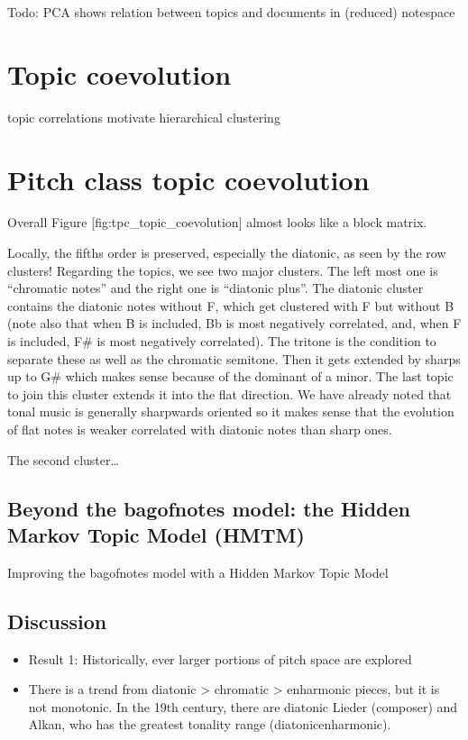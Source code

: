 \documentclass[letterpaper,10pt,english]{sphinxmanual}
\begin{document}
\sphinxAtStartPar
Todo: PCA shows relation between topics and documents in (reduced)
note\sphinxhyphen{}space


\section{Topic coevolution}
\label{\detokenize{5_notes:topic-coevolution}}
\sphinxAtStartPar
topic correlations motivate hierarchical clustering


\section{Pitch class \textendash{} topic coevolution}
\label{\detokenize{5_notes:pitch-class-topic-coevolution}}
\sphinxAtStartPar
Overall Figure {[}fig:tpc\_topic\_coevolution{]} almost looks like a block
matrix.

\sphinxAtStartPar
Locally, the fifths order is preserved, especially the diatonic, as seen
by the row clusters! Regarding the topics, we see two major clusters.
The left most one is “chromatic notes” and the right one is “diatonic
plus”. The diatonic cluster contains the diatonic notes without F, which
get clustered with F but without B (note also that when B is included,
Bb is most negatively correlated, and, when F is included, F\# is most
negatively correlated). The tritone is the condition to separate these
as well as the chromatic semitone. Then it gets extended by sharps up to
G\# which makes sense because of the dominant of a minor. The last topic
to join this cluster extends it into the flat direction. We have already
noted that tonal music is generally sharpwards oriented so it makes
sense that the evolution of flat notes is weaker correlated with
diatonic notes than sharp ones.

\sphinxAtStartPar
The second cluster…


\subsection{Beyond the bag\sphinxhyphen{}of\sphinxhyphen{}notes model: the Hidden Markov Topic Model (HMTM)}
\label{\detokenize{5_notes:beyond-the-bag-of-notes-model-the-hidden-markov-topic-model-hmtm}}
\sphinxAtStartPar
Improving the bag\sphinxhyphen{}of\sphinxhyphen{}notes model with a Hidden Markov Topic Model


\subsection{Discussion}
\label{\detokenize{5_notes:discussion}}\begin{itemize}
\item {} 
\sphinxAtStartPar
Result 1: Historically, ever larger portions of pitch space are explored

\item {} 
\sphinxAtStartPar
There is a trend from diatonic \textgreater{} chromatic \textgreater{} enharmonic pieces, but it
is not monotonic. In the 19th century, there are diatonic Lieder
(composer) and Alkan, who has the greatest tonality range
(diatonic\sphinxhyphen{}enharmonic).

\end{itemize}
\end{document}
